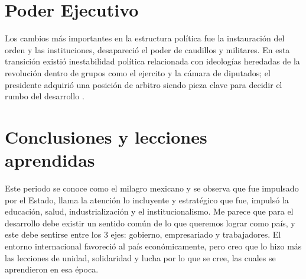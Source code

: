 \section{Poder Ejecutivo}
Los cambios más importantes en la estructura política fue la instauración del orden y las instituciones, desapareció el poder de caudillos y militares.
En esta transición existió inestabilidad política relacionada con ideologías heredadas de la revolución dentro de grupos como el ejercito y la cámara de diputados; el presidente adquirió una posición de arbitro siendo pieza clave para decidir el rumbo del desarrollo \cite{EstadoyDesarrolloUNAM}.

\section{Conclusiones y lecciones aprendidas}
Este periodo se conoce como el milagro mexicano y se observa que fue impulsado por el Estado, llama la atención lo incluyente y estratégico que fue, impulsó la educación, salud, industrialización y el institucionalismo. Me parece que para el desarrollo debe existir un sentido común de lo que queremos lograr como país, y este debe sentirse entre los 3 ejes: gobierno, empresariado y trabajadores. El entorno internacional favoreció al país económicamente, pero creo que lo hizo más las lecciones de unidad, solidaridad y lucha por lo que se cree, las cuales se aprendieron en esa época.
